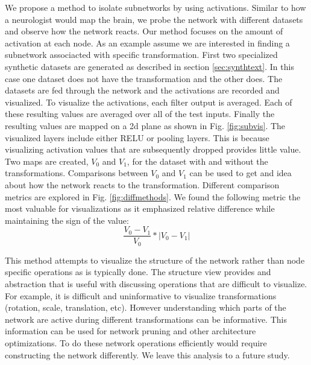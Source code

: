 \documentclass[10pt,twocolumn,letterpaper]{article}
\begin{document}
We propose a method to isolate subnetworks by using activations. Similar to how a neurologist would map the brain, we probe the network with different datasets and observe how the network reacts. Our method focuses on the amount of activation at each node. As an example assume we are interested in finding a subnetwork associacted with specific transformation. First two specialized synthetic datasets are generated as described in section \ref{sec:synthtext}. In this case one dataset does not have the transformation and the other does. The datasets are fed through the network and the activations are recorded and visualized. To visualize the activations, each filter output is averaged. Each of these resulting values are averaged over all of the test inputs. Finally the resulting values are mapped on a 2d plane as shown in Fig. \ref{fig:subvis}. The visualized layers include either RELU or pooling layers. This is because visualizing activation values that are subsequently dropped provides little value. Two maps are created, $V_0$ and $V_1$, for the dataset with and without the transformations. Comparisons between $V_0$ and $V_1$ can be used to get and idea about how the network reacts to the transformation. Different comparison metrics are explored in Fig. \ref{fig:diffmethods}. We found the following metric the most valuable for visualizations as it emphasized relative difference while maintaining the sign of the value: $$\frac{V_0-V_1}{V_0} * |V_0-V_1|$$


This method attempts to visualize the structure of the network rather than node specific operations as is typically done. The structure view provides and abstraction that is useful with discussing operations that are difficult to visualize. For example, it is difficult and uninformative to visualize transformations (rotation, scale, translation, etc). However understanding which parts of the network are active during different transformations can be informative. This information can be used for network pruning and other architecture optimizations. To do these network operations efficiently would require constructing the network differently. We leave this analysis to a future study.
\end{document}
